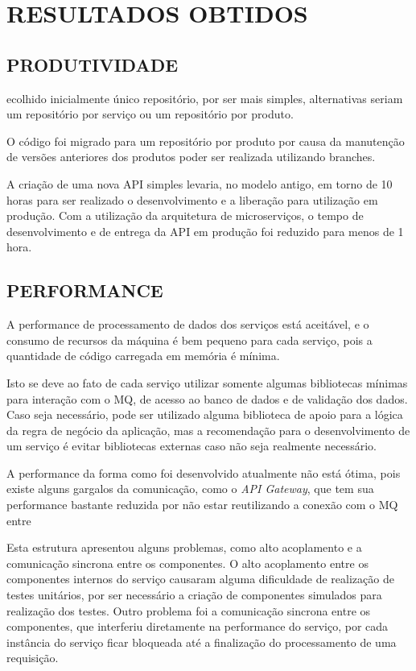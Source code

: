 \chapter{RESULTADOS OBTIDOS}
\label{chp:resultados}

\section{PRODUTIVIDADE}

ecolhido inicialmente único repositório, por ser mais simples, alternativas
seriam um repositório por serviço ou um repositório por produto.

O código foi migrado para um repositório por produto por causa da manutenção
de versões anteriores dos produtos poder ser realizada utilizando branches.

A criação de uma nova \ac{API} simples levaria, no modelo antigo, em torno
de 10 horas para ser realizado o desenvolvimento e a liberação para utilização
em produção. Com a utilização da arquitetura de microserviços, o tempo de
desenvolvimento e de entrega da \ac{API} em produção foi reduzido para
menos de 1 hora.

\section{PERFORMANCE}

A performance de processamento de dados dos serviços está aceitável, e
o consumo de recursos da máquina é bem pequeno para cada serviço, pois
a quantidade de código carregada em memória é mínima.

Isto se deve ao fato de cada serviço utilizar somente algumas
bibliotecas mínimas para interação com o \ac{MQ}, de acesso ao banco de
dados e de validação dos dados. Caso seja necessário, pode ser utilizado
alguma biblioteca de apoio para a lógica da regra de negócio da
aplicação, mas a recomendação para o desenvolvimento de um serviço
é evitar bibliotecas externas caso não seja realmente necessário.

A performance da forma como foi desenvolvido atualmente não está ótima,
pois existe alguns gargalos da comunicação, como o \emph{API Gateway}, que
tem sua performance bastante reduzida por não estar reutilizando a conexão
com o \ac{MQ} entre

Esta estrutura apresentou alguns problemas, como alto acoplamento e a
comunicação sincrona entre os componentes. O alto acoplamento entre
os componentes internos do serviço causaram alguma dificuldade de
realização de testes unitários, por ser necessário a criação de
componentes simulados para realização dos testes. Outro problema foi a
comunicação sincrona entre os componentes, que interferiu diretamente
na performance do serviço, por cada instância do serviço ficar bloqueada
até a finalização do processamento de uma requisição.

